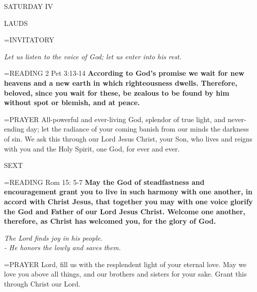 \begin{center}
\normalsize SATURDAY IV
\end{center}

\begin{flushleft}\normalsize LAUDS\\\end{flushleft}

\hangindent=\parindent \small{INVITATORY}
\begin{center}
\textit{Let us listen to the voice of God; let us enter into his rest.\\}
\end{center}

\hangindent=\parindent \small{READING} 2 Pet 3:13-14 \textbf{According to God’s promise we wait for new heavens and a new earth in which righteousness dwells. Therefore, beloved, since you wait for these, be zealous to be found by him without spot or blemish, and at peace.\\}

\hangindent=\parindent \small{PRAYER  All-powerful and ever-living God, splendor of true light, and never-ending day; let the radiance of your coming banish from our minds the darkness of sin. We ask this through our Lord Jesus Christ, your Son, who lives and reigns with you and the Holy Spirit, one God, for ever and ever.}

\begin{flushleft}\normalsize SEXT\\\end{flushleft}

\hangindent=\parindent \small{READING} Rom 15: 5-7 \textbf{May the God of steadfastness and encouragement grant you to live in such harmony with one another, in accord with Christ Jesus, that together you may with one voice glorify the God and Father of our Lord Jesus Christ. Welcome one another, therefore, as Christ has welcomed you, for the glory of God.  }

\begin{center}
\textit{The Lord finds joy in his people.\\
- He honors the lowly and saves them.}
\end{center}

\hangindent=\parindent \small{PRAYER  Lord, fill us with the resplendent light of your eternal love.  May we love you above all things, and our brothers and sisters for your sake. Grant this through Christ our Lord.}
